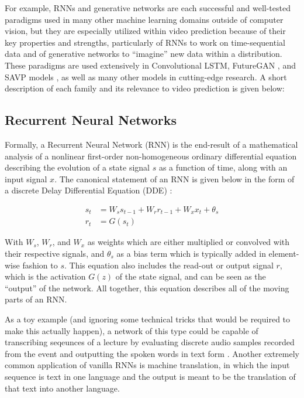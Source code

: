\documentclass{scrartcl}
\begin{document}
For example, RNNs and generative networks are each successful and well-tested
paradigms used in many other machine learning domains outside of computer
vision, but they are especially utilized within video prediction because of
their key properties and strengths, particularly of RNNs to work on
time-sequential data and of generative networks to ``imagine'' new data within
a distribution. These paradigms are used extensively in Convolutional LSTM,
FutureGAN \cite{futuregan}, and SAVP models \cite{savp}, as well as many other
models in cutting-edge research. A short description of each family and its
relevance to video prediction is given below:

\subsection{Recurrent Neural Networks}
\label{subsec:recurrent}

Formally, a Recurrent Neural Network (RNN) is the end-result of a mathematical
analysis of a nonlinear first-order non-homogeneous ordinary differential
equation describing the evolution of a state signal $s$ as a function of time,
along with an input signal $x$. The canonical statement of an RNN is given
below in the form of a discrete Delay Differential Equation (DDE)
\cite{rnn_and_lstm_fundamentals}:

\begin{equation}
	\begin{split}
		s_t & = W_s s_{t - 1} + W_r r_{t - 1} + W_x x_t + \theta_s \\
		r_t & = G ( s_t )
	\end{split}
	\label{eq:rnn_canonical}
\end{equation}

With $W_s$, $W_r$, and $W_x$ as weights which are either multiplied or
convolved with their respective signals, and $\theta_s$ as a bias term
which is typically added in element-wise fashion to $s$. This equation
also includes the read-out or output signal $r$, which is the activation
$G(z)$ of the state signal, and can be seen as the ``output'' of the network.
All together, this equation describes all of the moving parts of an RNN.

As a toy example (and ignoring some technical tricks that would be required to
make this actually happen), a network of this type could be capable of
transcribing seqeunces of a lecture by evaluating discrete audio samples
recorded from the event and outputting the spoken words in text form
\cite{rnn_and_lstm_fundamentals}. Another extremely common application of
vanilla RNNs is machine translation, in which the input sequence is text in one
language and the output is meant to be the translation of that text into
another language.
\end{document}
